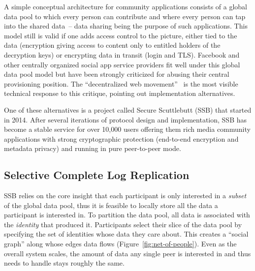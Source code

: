 \documentclass[9pt,sigconf]{acmart}
\begin{document}
A simple conceptual architecture for community applications consists
of a global data pool to which every person can contribute and where
every person can tap into the shared data~-- data sharing being the
purpose of such applications. This model still is valid if one adds
access control to the picture, either tied to the data (encryption
giving access to content only to entitled holders of the decryption
keys) or encrypting data in transit (login and TLS). Facebook and
other centrally organized social app service providers fit well under
this global data pool model but have been strongly criticized for
abusing their central provisioning position.  The ``decentralized web
movement''~\cite{decent-2018-aug} is the most visible technical
response to this critique, pointing out implementation alternatives.

One of these alternatives is a project called Secure Scuttlebutt (SSB)
that started in 2014. After several iterations of protocol design and
implementation, SSB has become a stable service for over 10,000 users
offering them rich media community applications with strong
cryptographic protection (end-to-end encryption and metadata privacy)
and running in pure peer-to-peer mode.

\subsection*{Selective Complete Log Replication}

SSB relies on the core insight that each  participant is only interested in a \textit{subset} of the global data pool, thus it is feasible to locally store all the data a participant is interested in. To partition the data pool, all data is associated with the \textit{identity} that produced it. Participants select their slice of the data pool by specifying the set of identities whose data they care about. This creates a ``social graph'' along whose edges data flows (Figure~\ref{fig:net-of-people}). Even as the overall system scales, the amount of data any single peer is interested in and thus needs to handle stays roughly the same.
\end{document}
